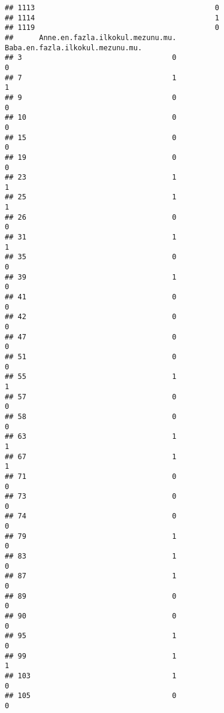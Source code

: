 \documentclass[
]{article}
\begin{document}
\begin{verbatim}
## 1113                                          0
## 1114                                          1
## 1119                                          0
##      Anne.en.fazla.ilkokul.mezunu.mu. Baba.en.fazla.ilkokul.mezunu.mu.
## 3                                   0                                0
## 7                                   1                                1
## 9                                   0                                0
## 10                                  0                                0
## 15                                  0                                0
## 19                                  0                                0
## 23                                  1                                1
## 25                                  1                                1
## 26                                  0                                0
## 31                                  1                                1
## 35                                  0                                0
## 39                                  1                                0
## 41                                  0                                0
## 42                                  0                                0
## 47                                  0                                0
## 51                                  0                                0
## 55                                  1                                1
## 57                                  0                                0
## 58                                  0                                0
## 63                                  1                                1
## 67                                  1                                1
## 71                                  0                                0
## 73                                  0                                0
## 74                                  0                                0
## 79                                  1                                0
## 83                                  1                                0
## 87                                  1                                0
## 89                                  0                                0
## 90                                  0                                0
## 95                                  1                                0
## 99                                  1                                1
## 103                                 1                                0
## 105                                 0                                0

\end{verbatim}
\end{document}
